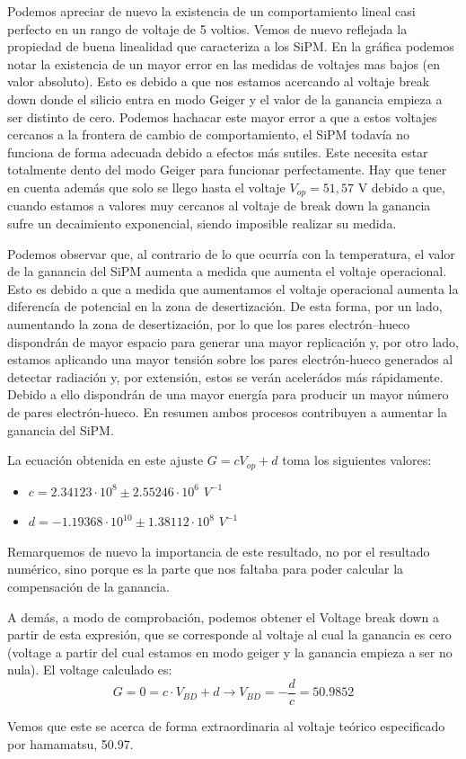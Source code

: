 \begin{itemize}
Podemos apreciar de nuevo la existencia de un comportamiento lineal casi perfecto en un rango de voltaje de 5 voltios. Vemos de nuevo reflejada la propiedad de buena linealidad que caracteriza a los SiPM. En la gráfica podemos notar la existencia de un mayor error en las medidas de voltajes mas bajos (en valor absoluto). Esto es debido a que nos estamos acercando al voltaje break down donde el silicio entra en modo Geiger y el valor de la ganancia empieza a ser distinto de cero. Podemos hachacar este mayor error a que a estos voltajes cercanos a la frontera de cambio de comportamiento, el SiPM todavía no funciona de forma adecuada debido a efectos más sutiles. Este necesita estar totalmente dento del modo Geiger para funcionar perfectamente. Hay que tener en cuenta además que solo se llego hasta el voltaje $V_{op}=51,57$ V debido a que, cuando estamos a valores muy cercanos al voltaje de break down la ganancia sufre un decaimiento exponencial, siendo imposible realizar su medida.

Podemos observar que, al contrario de lo que ocurría con la temperatura, el valor de la ganancia del SiPM aumenta a medida que aumenta el voltaje operacional. Esto es debido a que a medida que aumentamos el voltaje operacional aumenta la diferencía de potencial en la zona de desertización. De esta forma, por un lado, aumentando la zona de desertización, por lo que los pares electrón--hueco dispondrán de mayor espacio para generar una mayor replicación y, por otro lado, estamos aplicando una mayor tensión sobre los pares electrón-hueco generados al detectar radiación y, por extensión, estos se verán acelerádos más rápidamente. Debido a ello dispondrán de una mayor energía para producir un mayor número de pares electrón-hueco. En resumen ambos procesos contribuyen a aumentar la ganancia del SiPM.

La ecuación obtenida en este ajuste $G=cV_{op}+d$ toma los siguientes valores: 
\begin{itemize}
\item{} $c=2.34123 \cdot 10^8 \pm 2.55246 \cdot 10^6$ $V^{-1}$
\item{} $d=-1.19368 \cdot 10^{10} \pm 1.38112 \cdot 10^8$ $V^{-1}$
\end{itemize}

Remarquemos de nuevo la importancia de este resultado, no por el resultado numérico, sino porque es la parte que nos faltaba para poder calcular la compensación de la ganancia.

A demás, a modo de comprobación, podemos obtener el Voltage break down a partir de esta expresión, que se corresponde al voltaje al cual la ganancia es cero (voltage a partir del cual estamos en modo geiger y la ganancia empieza a ser no nula). El voltage calculado es: 
$$G=0=c \cdot V_{BD} +d \longrightarrow V_{BD}=-\frac{d}{c}=50.9852$$

Vemos que este se acerca de forma extraordinaria al voltaje teórico especificado por hamamatsu, 50.97.
\end{itemize}